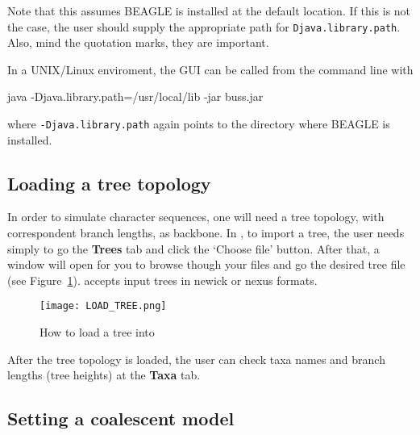 Note that this assumes BEAGLE is installed at the default location. If this is not the case, the user should supply the appropriate path for \texttt{Djava.library.path}. Also, mind the quotation marks, they are important.

In a UNIX/Linux enviroment, the {\bussname} GUI can be called from the command line with

\begin{code}
java -Djava.library.path=/usr/local/lib -jar buss.jar 
\end{code}

\noindent
where \texttt{-Djava.library.path} again points to the directory where BEAGLE is installed.

\def\loading{Loading a tree topology}
\subsection{\loading}

In order to simulate character sequences, one will need a tree topology, with correspondent branch lengths, as  backbone. In {\bussname}, to import a tree, the user needs simply to go the \textbf{Trees} tab and click the `Choose file' button. After that, a window will open for you to browse though your files and go the desired tree file (see Figure~\ref{fig:loadingtopology}). {\bussname} accepts input trees in newick or nexus formats.
\begin{figure}[H]
\begin{center}
\texttt{[image: LOAD\_TREE.png]} 
\end{center}
\caption{How to load a tree into {\bussname}}
\label{fig:loadingtopology}
\end{figure}

After the tree topology is loaded, the user can check taxa names and branch lengths (tree heights) at the \textbf{Taxa} tab. 

\subsection{Setting a coalescent model}

